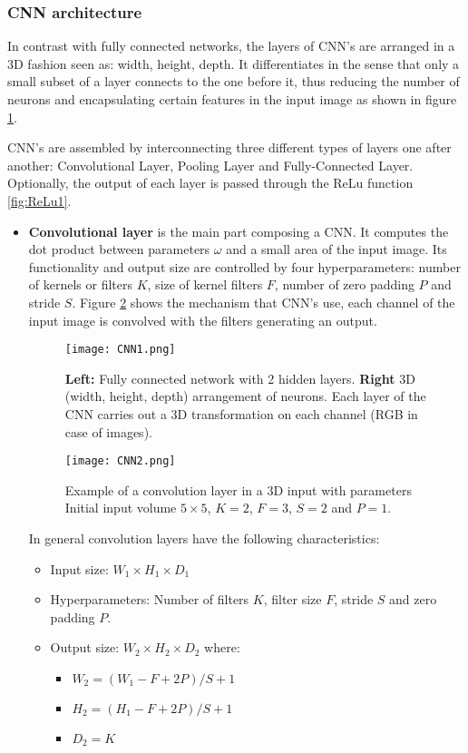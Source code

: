 \subsubsection{CNN architecture}
In contrast with fully connected networks, the layers of CNN's are arranged in a 3D fashion seen as: width, height, depth. It differentiates in the sense that only a small subset of a layer connects to the one before it, thus reducing the number of neurons and encapsulating certain features in the input image as shown in  figure \ref{fig:CNNim1}. \

CNN's are assembled by interconnecting three different types of layers one after another: Convolutional Layer, Pooling Layer and Fully-Connected Layer. Optionally, the output of each layer is passed through the ReLu function \ref{fig:ReLu1}. 
\begin{itemize}
\item \textbf{Convolutional layer} is the main part composing a CNN. It computes the dot product between parameters $\omega$ and a small area of the input image. Its  functionality and output size are controlled by four hyperparameters: number of kernels or filters $K$, size of kernel filters $F$, number of zero padding $P$ and stride $S$. Figure \ref{fig:CNNim2} shows the mechanism that  CNN's use, each channel of the input image is convolved with the filters generating an output.  \

\begin{figure}[tb] 
\centering 
\texttt{[image: CNN1.png]} 
\caption[Fully connected network VS CNN]{\textbf{Left:} Fully connected network with 2 hidden layers. \textbf{Right} 3D (width, height, depth) arrangement of neurons. Each layer of the CNN carries out a 3D transformation on each channel (RGB in case of images). }
\label{fig:CNNim1} 
\end{figure}
\begin{figure}[tb] 
\centering 
\texttt{[image: CNN2.png]} 
\caption[Convolution layer]{Example of a convolution layer in a 3D input with parameters Initial input volume $5 \times 5$, $K=2$, $F=3$, $S=2$ and $P=1$.}
\label{fig:CNNim2} 
\end{figure}


In general convolution layers have the following characteristics:
\begin{itemize}
\item Input size: \boldmath$W_1 \times H_1 \times D_1$
\item Hyperparameters: Number of filters \boldmath$K$, filter size \boldmath$F$, stride \boldmath$S$ and zero padding \boldmath$P$.  
\item Output size: \boldmath$W_2 \times H_2 \times D_2$ where:
\begin{itemize} \label{sec:outCNN}
\item \boldmath$W_2 = ( W_1 - F + 2P) / S + 1 $
\item \boldmath$H_2 = ( H_1 - F + 2P) / S + 1 $
\item \boldmath$D_2 = K $
\end{itemize}
\end{itemize}


\end{itemize}
